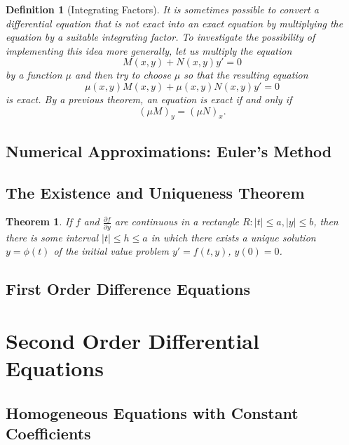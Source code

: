 \documentclass[10pt]{report}
\newtheorem{thm3}{Theorem}[subsection]
\newtheorem{def3}{Definition}[subsection]
\begin{document}
\begin{def3}[Integrating Factors]
It is sometimes possible to convert a differential equation that is not exact into an exact equation by multiplying the equation by a suitable integrating factor. To investigate the possibility of implementing this idea more generally, let us multiply the equation
$$M(x,y) + N(x,y)y' =0$$
by a function $\mu$ and then try to choose $\mu$ so that the resulting equation
$$\mu(x,y)M(x,y) + \mu(x,y)N(x,y)y' =0$$
is exact. By a previous theorem, an equation is exact if and only if 
$$(\mu M)_y = (\mu N)_x.$$
\end{def3}
\subsection{Numerical Approximations: Euler's Method}
\subsection{The Existence and Uniqueness Theorem}
\begin{thm3}
If $f$ and $\frac{\partial f}{\partial y}$ are continuous in a rectangle $R:|t|\leq a, |y|\leq b$, then there is some interval $|t|\leq h\leq a$ in which there exists a unique solution $y=\phi(t)$ of the initial value problem $y'=f(t,y)$, $y(0)=0$.
\end{thm3}
\subsection{First Order Difference Equations}
\section{Second Order Differential Equations}
\subsection{Homogeneous Equations with Constant Coefficients}
\end{document}
